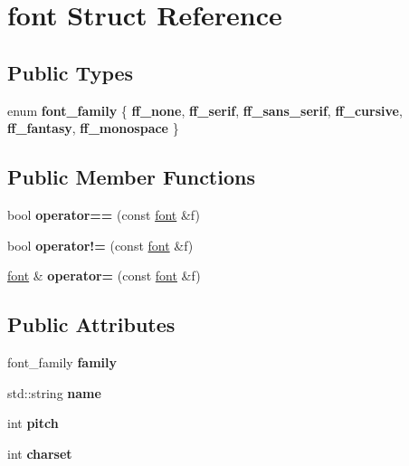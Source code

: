 \hypertarget{structfont}{}\section{font Struct Reference}
\label{structfont}
\subsection*{Public Types}
\begin{DoxyCompactItemize}
\item 
\mbox{\label{structfont_ab71d1d41c5221ea7b4e3b3e62fcd63a4}} 
enum {\bfseries font\+\_\+family} \{ \newline
{\bfseries ff\+\_\+none}, 
{\bfseries ff\+\_\+serif}, 
{\bfseries ff\+\_\+sans\+\_\+serif}, 
{\bfseries ff\+\_\+cursive}, 
\newline
{\bfseries ff\+\_\+fantasy}, 
{\bfseries ff\+\_\+monospace}
 \}
\end{DoxyCompactItemize}
\subsection*{Public Member Functions}
\begin{DoxyCompactItemize}
\item 
\mbox{\label{structfont_a1de91d655d5b725c011464c97cae4208}} 
bool {\bfseries operator==} (const \hyperlink{structfont}{font} \&f)
\item 
\mbox{\label{structfont_a88a8f970e7abe1cbe86adcb4ad109dcc}} 
bool {\bfseries operator!=} (const \hyperlink{structfont}{font} \&f)
\item 
\mbox{\label{structfont_a0e25f0e478931c36b7b597b0ba5a92c8}} 
\hyperlink{structfont}{font} \& {\bfseries operator=} (const \hyperlink{structfont}{font} \&f)
\end{DoxyCompactItemize}
\subsection*{Public Attributes}
\begin{DoxyCompactItemize}
\item 
\mbox{\label{structfont_ae6bbbbe90e69787f255971b16bfac266}} 
font\+\_\+family {\bfseries family}
\item 
\mbox{\label{structfont_afc43c04f2142dae82b0402d422bbea46}} 
std\+::string {\bfseries name}
\item 
\mbox{\label{structfont_ae8972882dfaa634b3019e0a1b83dcd74}} 
int {\bfseries pitch}
\item 
\mbox{\label{structfont_a372416a335a5bbf8eee6fcb16a6c1a8e}} 
int {\bfseries charset}
\end{DoxyCompactItemize}


